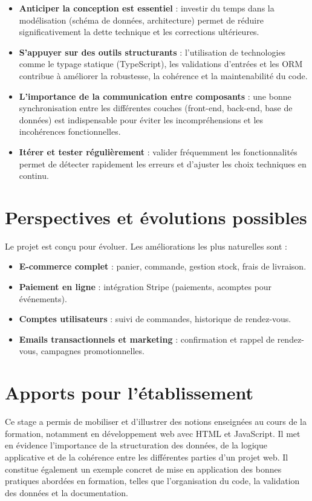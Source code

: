 \begin{itemize}
    \item \textbf{Anticiper la conception est essentiel} : investir du temps dans la modélisation (schéma de données, architecture) permet de réduire significativement la dette technique et les corrections ultérieures.

    \item \textbf{S’appuyer sur des outils structurants} : l’utilisation de technologies comme le typage statique (TypeScript), les validations d’entrées et les ORM contribue à améliorer la robustesse, la cohérence et la maintenabilité du code.

    \item \textbf{L’importance de la communication entre composants} : une bonne synchronisation entre les différentes couches (front-end, back-end, base de données) est indispensable pour éviter les incompréhensions et les incohérences fonctionnelles.

    \item \textbf{Itérer et tester régulièrement} : valider fréquemment les fonctionnalités permet de détecter rapidement les erreurs et d’ajuster les choix techniques en continu.

\end{itemize}

\section{Perspectives et évolutions possibles}
Le projet est conçu pour évoluer. Les améliorations les plus naturelles sont :
\begin{itemize}
    \item \textbf{E-commerce complet} : panier, commande, gestion stock, frais de livraison.
    \item \textbf{Paiement en ligne} : intégration Stripe (paiements, acomptes pour événements).
    \item \textbf{Comptes utilisateurs} : suivi de commandes, historique de rendez-vous.
    \item \textbf{Emails transactionnels et marketing} : confirmation et rappel de rendez-vous, campagnes promotionnelles.
\end{itemize}

\section{Apports pour l’établissement}
Ce stage a permis de mobiliser et d’illustrer des notions enseignées au cours de la formation, notamment en développement web avec HTML et JavaScript. Il met en évidence l’importance de la structuration des données, de la logique applicative et de la cohérence entre les différentes parties d’un projet web. Il constitue également un exemple concret de mise en application des bonnes pratiques abordées en formation, telles que l’organisation du code, la validation des données et la documentation.

